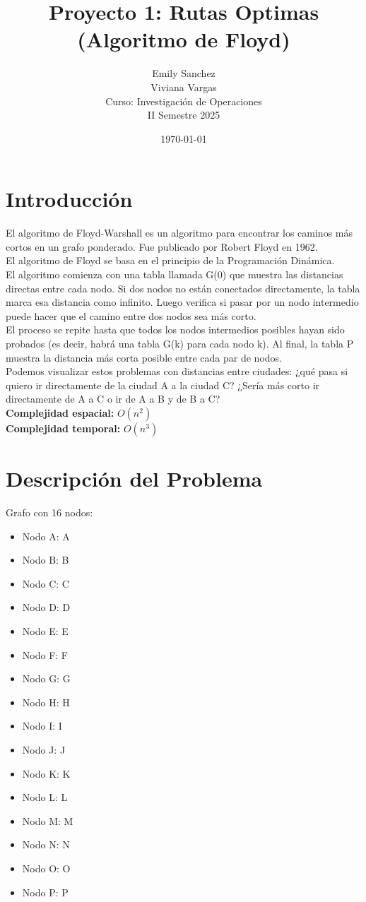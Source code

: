 \documentclass[12pt]{article}
\title{Proyecto 1: Rutas Optimas (Algoritmo de Floyd)}
\author{Emily Sanchez \\ Viviana Vargas \\[1cm] Curso: Investigación de Operaciones \\ II Semestre 2025}
\date{\today}
\begin{document}
\maketitle
\thispagestyle{empty}
\newpage
\setcounter{page}{1}

\section{Introducción}
El algoritmo de Floyd-Warshall es un algoritmo para encontrar los caminos más cortos en un grafo ponderado. Fue publicado por Robert Floyd en 1962.\\
El algoritmo de Floyd se basa en el principio de la Programación Dinámica.\\
El algoritmo comienza con una tabla llamada G(0) que muestra las distancias directas entre cada nodo. Si dos nodos no están conectados directamente, la tabla marca esa distancia como infinito. Luego verifica si pasar por un nodo intermedio puede hacer que el camino entre dos nodos sea más corto.\\
El proceso se repite hasta que todos los nodos intermedios posibles hayan sido probados (es decir, habrá una tabla G(k) para cada nodo k). Al final, la tabla P muestra la distancia más corta posible entre cada par de nodos.\\
Podemos visualizar estos problemas con distancias entre ciudades: ¿qué pasa si quiero ir directamente de la ciudad A a la ciudad C? ¿Sería más corto ir directamente de A a C o ir de A a B y de B a C?\\
\textbf{Complejidad espacial:} $O(n^2)$\\
\textbf{Complejidad temporal:} $O(n^3)$\\
\clearpage
\section{Descripción del Problema}
Grafo con 16 nodos:

\begin{itemize}
\item Nodo A: A
\item Nodo B: B
\item Nodo C: C
\item Nodo D: D
\item Nodo E: E
\item Nodo F: F
\item Nodo G: G
\item Nodo H: H
\item Nodo I: I
\item Nodo J: J
\item Nodo K: K
\item Nodo L: L
\item Nodo M: M
\item Nodo N: N
\item Nodo O: O
\item Nodo P: P
\end{itemize}
\end{document}
